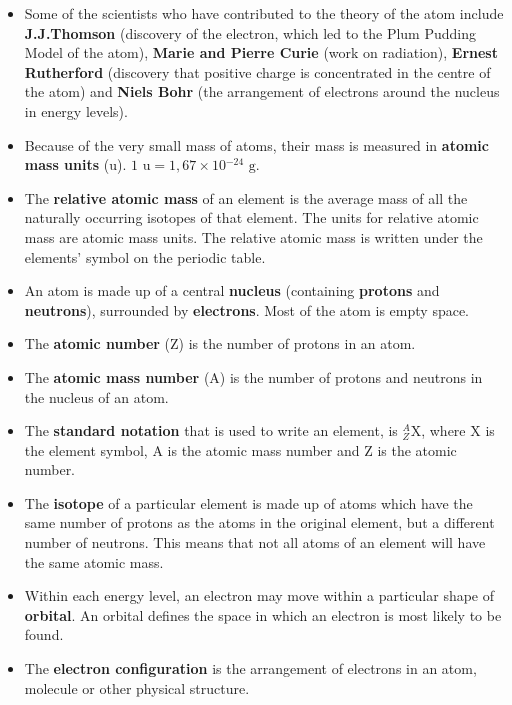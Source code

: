       \label{m38741*id262657}\begin{itemize}[noitemsep]
\item Some of the scientists who have contributed to the theory of the atom include \textbf{J.J.Thomson} (discovery of the electron, which led to the Plum Pudding Model of the atom), \textbf{Marie and Pierre Curie} (work on radiation), \textbf{Ernest Rutherford} (discovery that positive charge is concentrated in the centre of the atom) and \textbf{Niels Bohr} (the arrangement of electrons around the nucleus in energy levels).
\label{m38741*uid171}\item Because of the very small mass of atoms, their mass is measured in \textbf{atomic mass units} (u). $1 \text{ u} = 1,67 \times 10{}^{-24}\text{ g}$.
\item The \textbf{relative atomic mass} of an element is the average mass of all the naturally occurring isotopes of that element. The units for relative atomic mass are atomic mass units. The relative atomic mass is written under the elements' symbol on the periodic table.
\label{m38741*uid172}\item An atom is made up of a central \textbf{nucleus} (containing \textbf{protons} and \textbf{neutrons}), surrounded by \textbf{electrons}. Most of the atom is empty space.
\label{m38741*uid173}\item The \textbf{atomic number} (Z) is the number of protons in an atom.
\label{m38741*uid174}\item The \textbf{atomic mass number} (A) is the number of protons and neutrons in the nucleus of an atom.
\label{m38741*uid175}\item The \textbf{standard notation} that is used to write an element, is $_{Z}^{A}\text{X}$, where X is the element symbol, A is the atomic mass number and Z is the atomic number.
\label{m38741*uid176}\item The \textbf{isotope} of a particular element is made up of atoms which have the same number of protons as the atoms in the original element, but a different number of neutrons. This means that not all atoms of an element will have the same atomic mass.
\label{m38741*uid179}\item Within each energy level, an electron may move within a particular shape of \textbf{orbital}. An orbital defines the space in which an electron is most likely to be found. 
\item The \textbf{electron configuration} is the arrangement of electrons in an atom, molecule or other physical structure.

\end{itemize}
